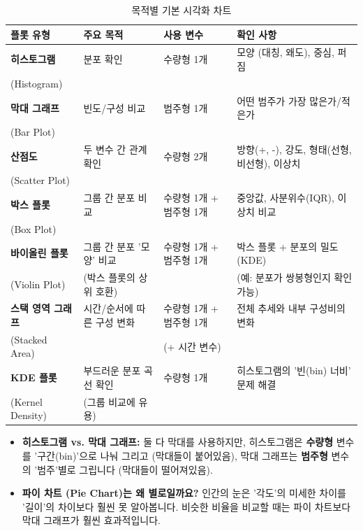 \documentclass[11pt,a4paper]{book}
\theoremstyle{definition}
\begin{document}
\begin{table}[h!]
\centering
\caption{목적별 기본 시각화 차트}
\label{tab:plots}
\begin{tabular}{@{}lp{4cm}p{4cm}p{3cm}@{}}
\toprule
\textbf{플롯 유형} & \textbf{주요 목적} & \textbf{사용 변수} & \textbf{확인 사항} \\
\midrule
\textbf{히스토그램} & 분포 확인 & 수량형 1개 & 모양 (대칭, 왜도), 중심, 퍼짐 \\
(Histogram) & & & \\
\addlinespace
\textbf{막대 그래프} & 빈도/구성 비교 & 범주형 1개 & 어떤 범주가 가장 많은가/적은가 \\
(Bar Plot) & & & \\
\addlinespace
\textbf{산점도} & 두 변수 간 관계 확인 & 수량형 2개 & 방향(+, -), 강도, 형태(선형, 비선형), 이상치 \\
(Scatter Plot) & & & \\
\addlinespace
\textbf{박스 플롯} & 그룹 간 분포 비교 & 수량형 1개 + 범주형 1개 & 중앙값, 사분위수(IQR), 이상치 비교 \\
(Box Plot) & & & \\
\addlinespace
\textbf{바이올린 플롯} & 그룹 간 분포 '모양' 비교 & 수량형 1개 + 범주형 1개 & 박스 플롯 + 분포의 밀도(KDE) \\
(Violin Plot) & (박스 플롯의 상위 호환) & & (예: 분포가 쌍봉형인지 확인 가능) \\
\addlinespace
\textbf{스택 영역 그래프} & 시간/순서에 따른 구성 변화 & 수량형 1개 + 범주형 1개 & 전체 추세와 내부 구성비의 변화 \\
(Stacked Area) & & (+ 시간 변수) & \\
\addlinespace
\textbf{KDE 플롯} & 부드러운 분포 곡선 확인 & 수량형 1개 & 히스토그램의 '빈(bin) 너비' 문제 해결 \\
(Kernel Density) & (그룹 비교에 유용) & & \\
\bottomrule
\end{tabular}
\end{table}

\begin{itemize}
    \item \textbf{히스토그램 vs. 막대 그래프:} 둘 다 막대를 사용하지만, 히스토그램은 \textbf{수량형} 변수를 '구간(bin)'으로 나눠 그리고 (막대들이 붙어있음), 막대 그래프는 \textbf{범주형} 변수의 '범주'별로 그립니다 (막대들이 떨어져있음).
    \item \textbf{파이 차트 (Pie Chart)는 왜 별로일까요?}
    인간의 눈은 '각도'의 미세한 차이를 '길이'의 차이보다 훨씬 못 알아봅니다. 비슷한 비율을 비교할 때는 파이 차트보다 막대 그래프가 훨씬 효과적입니다.
\end{itemize}
\end{document}
